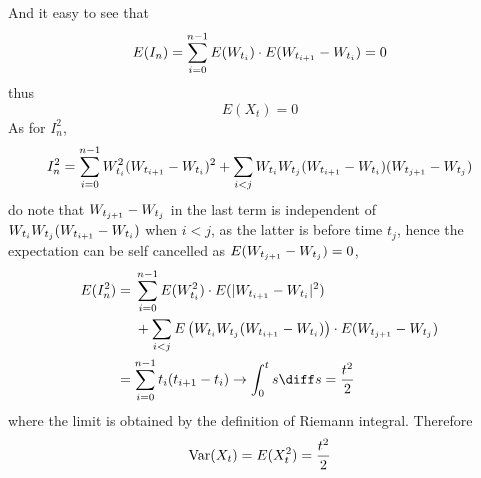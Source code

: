     And it easy to see that
    \[E(I_n)=\sum_{i=0}^{n-1} E(W_{t_i})\cdot E(W_{t_{i+1}}-W_{t_i})=0\]
    thus
    \[E(X_t)=0\]
    As for $I_n^2$,
    \[I_n^2=\sum_{i=0}^{n-1}W_{t_i}^2(W_{t_{i+1}}-W_{t_i})^2
    +\sum_{i<j}W_{t_i}W_{t_j}(W_{t_{i+1}}-W_{t_i})(W_{t_{j+1}}-W_{t_j})\]
    do note that $W_{t_{j+1}}-W_{t_j}$ in the last term is independent
    of $W_{t_i}W_{t_j}(W_{t_{i+1}}-W_{t_i})$ when $i<j$, as the latter is before
    time $t_j$, hence the expectation can be self cancelled
    as $E(W_{t_{j+1}}-W_{t_j})=0$,
    \[\begin{aligned}
        E(I_n^2)
        &=\begin{aligned}[t]
         &\sumhead E(\wi^2)\cdot E(|\deltaw|^2)\\
         &+\sum_{i<j}E\left(\wi\wj(\deltaw)\right)\cdot E(\deltawj)
         \end{aligned}\\
        &=\sumhead t_i(t_{i+1}-t_i)
        \to\int_0^ts\diff s=\frac{t^2}{2}
    \end{aligned}\]
    where the limit is obtained by the definition of Riemann integral.
    Therefore
    \[\mathrm{Var}(X_t)=E(X_t^2)=\frac{t^2}{2}\]


